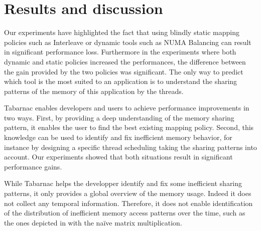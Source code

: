\section{Results and discussion}
\label{sec:tab-cncl}

Our experiments have highlighted the fact that using blindly static mapping policies such as Interleave or dynamic tools such as \gls{NUMA} Balancing can result in significant performance loss.
Furthermore in the experiments where both dynamic and static policies increased the performances, the difference between the gain provided by the two policies was significant.
The only way to predict which tool is the most suited to an application is to understand the sharing patterns of the memory of this application by the threads.

\gls{Tabarnac} enables developers and users to achieve performance improvements in two ways.
First, by providing a deep understanding of the memory sharing pattern, it enables the user to find the best existing mapping policy.
Second, this knowledge can be used to identify and fix inefficient memory behavior, for instance by designing a specific thread scheduling taking the sharing patterns into account.
Our experiments showed that both situations result in significant performance gains.

While \gls{Tabarnac} helps the developper identify and fix some inefficient sharing patterns, it only provides a global overview of the memory usage.
Indeed it does not collect any temporal information.
Therefore, it does not enable identification of the distribution of inefficient memory access patterns over the time, such as the ones depicted in  with the naïve matrix multiplication.

